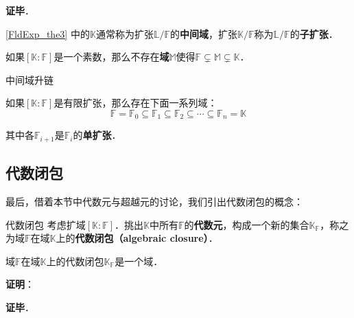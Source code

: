 \textbf{证毕}．


\autoref{FldExp_the3} 中的$\mathbb{K}$通常称为扩张$\mathbb{L}/\mathbb{F}$的\textbf{中间域}，扩张$\mathbb{K}/\mathbb{F}$称为$\mathbb{L}/\mathbb{F}$的\textbf{子扩张}．






\begin{corollary}{}
如果$[\mathbb{K}:\mathbb{F}]$是一个素数，那么不存在\textbf{域}$\mathbb{M}$使得$\mathbb{F}\subsetneq\mathbb{M}\subsetneq\mathbb{K}$．
\end{corollary}


\begin{corollary}{中间域升链}

如果$[\mathbb{K}:\mathbb{F}]$是有限扩张，那么存在下面一系列域：
\begin{equation}
\mathbb{F}=\mathbb{F}_0\subseteq\mathbb{F}_1\subseteq\mathbb{F}_2\subseteq\cdots\subseteq\mathbb{F}_n=\mathbb{K}
\end{equation}

其中各$\mathbb{F}_{i+1}$是$\mathbb{F}_i$的\textbf{单扩张}．

\end{corollary}


\subsection{代数闭包}

最后，借着本节中代数元与超越元的讨论，我们引出代数闭包的概念：


\begin{definition}{代数闭包}
考虑扩域$[\mathbb{K}:\mathbb{F}]$．挑出$\mathbb{K}$中所有$\mathbb{F}$的\textbf{代数元}，构成一个新的集合$\mathbb{K}_{\mathbb{F}}$，称之为域$\mathbb{F}$在域$\mathbb{K}$上的\textbf{代数闭包（algebraic closure）}．
\end{definition}

\begin{theorem}{}

域$\mathbb{F}$在域$\mathbb{K}$上的代数闭包$\mathbb{K}_{\mathbb{F}}$是一个域．

\end{theorem}

\textbf{证明}：



\textbf{证毕}．








